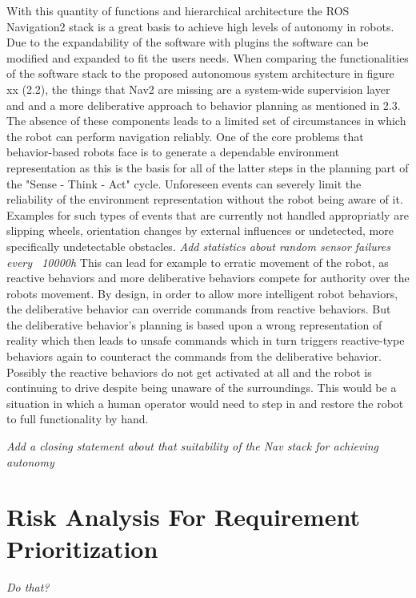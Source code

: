 With this quantity of functions and hierarchical architecture the ROS Navigation2 stack is a great basis to achieve high levels of autonomy in robots. Due to the expandability of the software with plugins the software can be modified and expanded to fit the users needs. 
When comparing the functionalities of the software stack to the proposed autonomous system architecture in figure xx (2.2), the things that Nav2 are missing are a system-wide supervision layer and and a more deliberative approach to behavior planning as mentioned in 2.3.
The absence of these components leads to a limited set of circumstances in which the robot can perform navigation reliably. One of the core problems that behavior-based robots face is to generate a dependable environment representation as this is the basis for all of the latter steps in the planning part of the "Sense - Think - Act" cycle. Unforeseen events can severely limit the reliability of the environment representation without the robot being aware of it. Examples for such types of events that are currently not handled appropriatly are slipping wheels, orientation changes by external influences or undetected, more specifically undetectable obstacles. \textit{Add statistics about random sensor failures every ~10000h} This can lead for example to erratic movement of the robot, as reactive behaviors and more deliberative behaviors compete for authority over the robots movement. By design, in order to allow more intelligent robot behaviors, the deliberative behavior can override commands from reactive behaviors. But the deliberative behavior's planning is based upon a wrong representation of reality which then leads to unsafe commands which in turn triggers reactive-type behaviors again to counteract the commands from the deliberative behavior. Possibly the reactive behaviors do not get activated at all and the robot is continuing to drive despite being unaware of the surroundings. This would be a situation in which a human operator would need to step in and restore the robot to full functionality by hand. 

\textit{Add a closing statement about that suitability of the Nav stack for achieving autonomy}




\section{Risk Analysis For Requirement Prioritization}

\textit{Do that?}

